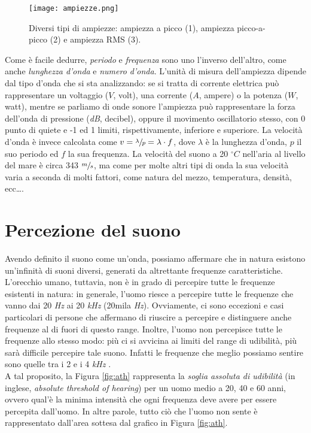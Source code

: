 		\begin{figure}[h!]
			\centering
				\texttt{[image: ampiezze.png]}
			\caption[Diversi tipi di ampiezze.]{Diversi tipi di ampiezze: ampiezza a picco (1), ampiezza picco-a-picco (2) e ampiezza RMS (3).}
			\label{fig:ampiezze}
		\end{figure}
		
		Come è facile dedurre, \textit{periodo} e \textit{frequenza} sono uno l'inverso dell'altro, come anche \textit{lunghezza d'onda} e \textit{numero d'onda}. L'unità di misura dell'ampiezza dipende dal tipo d'onda che si sta analizzando: se si tratta di corrente elettrica può rappresentare un voltaggio ($V$, volt), una corrente ($A$, ampere) o la potenza ($W$, watt), mentre se parliamo di onde sonore l'ampiezza può rappresentare la forza dell'onda di pressione (\textit{dB}, decibel), oppure il movimento oscillatorio stesso, con 0 punto di quiete e -1 ed 1 limiti, rispettivamente, inferiore e superiore. La velocità d'onda è invece calcolata come $v=\sfrac{\lambda}{p}=\lambda\cdot f$, dove $\lambda$ è la lunghezza d'onda, $p$ il suo periodo ed $f$ la sua frequenza. La velocità del suono a 20 ${}^\circ C$ nell'aria al livello del mare è circa 343 $\sfrac{m}{s}$, ma come per molte altri tipi di onda la sua velocità varia a seconda di molti fattori, come natura del mezzo, temperatura, densità, ecc\dots.
	
	\section{Percezione del suono} \label{sec:percezione}
	
		Avendo definito il suono come un'onda, possiamo affermare che in natura esistono un'infinità di suoni diversi, generati da altrettante frequenze caratteristiche. L'orecchio umano, tuttavia, non è in grado di percepire tutte le frequenze esistenti in natura: in generale, l'uomo riesce a percepire tutte le frequenze che vanno dai 20 \textit{Hz} ai 20 \textit{kHz} (20mila \textit{Hz}). Ovviamente, ci sono eccezioni e casi particolari di persone che affermano di riuscire a percepire e distinguere anche frequenze al di fuori di questo range. Inoltre, l'uomo non percepisce tutte le frequenze allo stesso modo: più ci si avvicina ai limiti del range di udibilità, più sarà difficile percepire tale suono. Infatti le frequenze che meglio possiamo sentire sono quelle tra i 2 e i 4 \textit{kHz} \cite{raissi}.\\
		A tal proposito, la Figura \ref{fig:ath} rappresenta la \textit{soglia assoluta di udibilità} (in inglese, \textit{absolute threshold of hearing}) per un uomo medio a 20, 40 e 60 anni, ovvero qual'è la minima intensità che ogni frequenza deve avere per essere percepita dall'uomo. In altre parole, tutto ciò che l'uomo non sente è rappresentato dall'area sottesa dal grafico in Figura \ref{fig:ath}.
		
